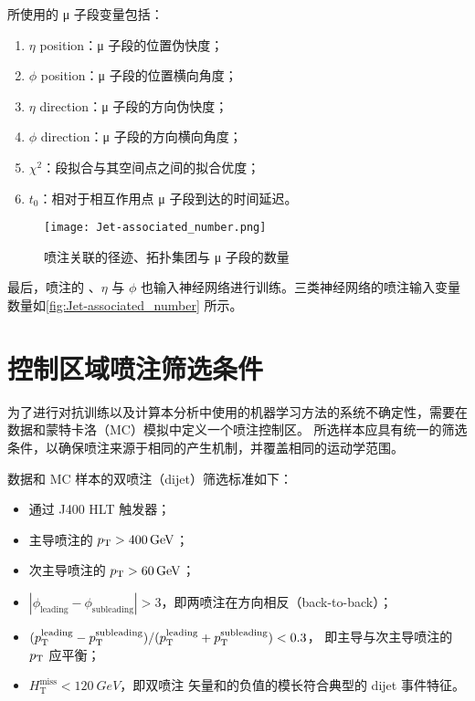 所使用的 μ 子段变量包括：
\begin{enumerate}
      \item $\eta$ position：μ 子段的位置伪快度；
      \item $\phi$ position：μ 子段的位置横向角度；
      \item $\eta$ direction：μ 子段的方向伪快度；
      \item $\phi$ direction：μ 子段的方向横向角度；
      \item $\chi^2$：段拟合与其空间点之间的拟合优度；
      \item $t_0$：相对于相互作用点 μ 子段到达的时间延迟。
\end{enumerate}

\begin{figure}[ht]
      \centering
      \texttt{[image: Jet-associated\_number.png]}
      \caption{喷注关联的径迹、拓扑集团与 μ 子段的数量}
      \label{fig:Jet-associated_number}
\end{figure}

最后，喷注的 \pt、$\eta$ 与 $\phi$ 也输入神经网络进行训练。三类神经网络的喷注输入变量数量如\autoref{fig:Jet-associated_number} 所示。


\section{控制区域喷注筛选条件}
\label{cpm:CR_jet_selection}

为了进行对抗训练以及计算本分析中使用的机器学习方法的系统不确定性，需要在数据和蒙特卡洛（MC）模拟中定义一个喷注控制区。
所选样本应具有统一的筛选条件，以确保喷注来源于相同的产生机制，并覆盖相同的运动学范围。

数据和 MC 样本的双喷注（dijet）筛选标准如下：
\begin{itemize}
      \item 通过 J400 HLT 触发器；
      \item 主导喷注的 $p_{\text{T}} > \SI{400}{GeV}$；
      \item 次主导喷注的 $p_{\text{T}} > \SI{60}{GeV}$；
      \item $|\phi_{\text{leading}} - \phi_{\text{subleading}}| > 3$，即两喷注在方向相反（back-to-back）；
      \item $(p_{\text{T}}^{\text{leading}} - p_{\text{T}}^{\text{subleading}}) / (p_{\text{T}}^{\text{leading}} + p_{\text{T}}^{\text{subleading}}) < 0.3$，
            即主导与次主导喷注的 $p_{\text{T}}$ 应平衡；
      \item $H_\text{T}^\text{miss} < \SI{120}{GeV}$，即双喷注 \pt 矢量和的负值的模长符合典型的 dijet 事件特征。
\end{itemize}

